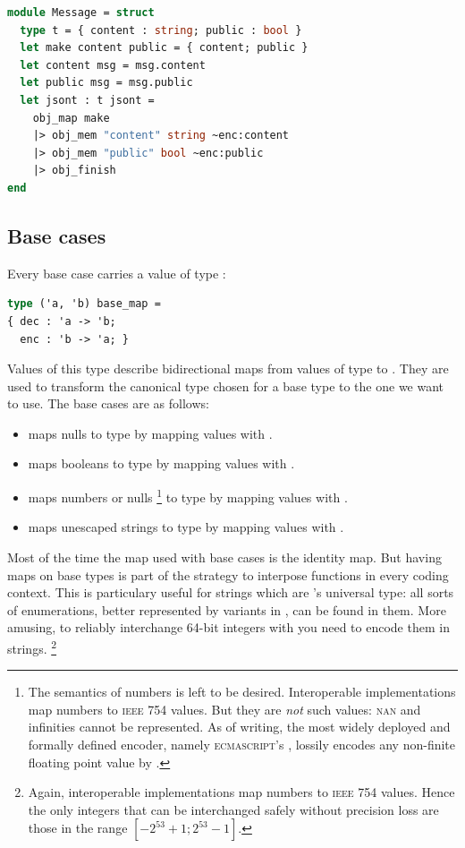 \documentclass[nolinenum]{jfp}
\begin{document}
\begin{lstlisting}[language=ocaml]
module Message = struct
  type t = { content : string; public : bool }
  let make content public = { content; public }
  let content msg = msg.content
  let public msg = msg.public
  let jsont : t jsont =
    obj_map make
    |> obj_mem "content" string ~enc:content
    |> obj_mem "public" bool ~enc:public
    |> obj_finish
end
\end{lstlisting}

\subsection{Base cases}
\label{sec:base_cases}

Every base case carries a value of type :
%
\begin{lstlisting}[language=ocaml]
type ('a, 'b) base_map =
{ dec : 'a -> 'b;
  enc : 'b -> 'a; }
\end{lstlisting}
%
Values of this type describe bidirectional maps from values of type
 to . They are used to transform the canonical \ml{}
type  chosen for a \json{} base type to the one we want to
use. The base cases are as follows:

\begin{itemize}
\item
{} maps \json{} nulls to type  by mapping
 values with .
%
\item
{} maps \json{} booleans to type  by mapping
 values with .
%
\item
{} maps \json{} numbers or
nulls%
\footnote{The semantics of \json{} numbers is left to be desired.
Interoperable \json{} implementations map \json{} numbers to
\textsc{ieee} 754  values. But they are \emph{not} such
values: \textsc{nan} and infinities cannot be represented. As of
writing, the most widely deployed and formally defined \json{}
encoder, namely \textsc{ecmascript}'s \mbox{}
\citep{ecmascript}, lossily encodes any non-finite floating point value by
.}
to type  by mapping  values with .
%
\item
{} maps unescaped \json{} strings to type  by
mapping  values with .
\end{itemize}

Most of the time the map  used with base cases is the identity
map. But having maps on base types is part of the strategy to
interpose functions in every coding context. This is particulary
useful for \json{} strings which are \json{}'s universal type: all
sorts of enumerations, better represented by variants in \ml{}, can be
found in them. More amusing, to reliably interchange \mbox{64-bit}
integers with \json{} you need to encode them in strings.%
\footnote{Again, interoperable \json{} implementations map
\json{} numbers to \textsc{ieee} 754  values. Hence the
only integers that can be interchanged safely without precision loss
are those in the range $[-2^{53}+1;2^{53}-1]$.}
\end{document}
